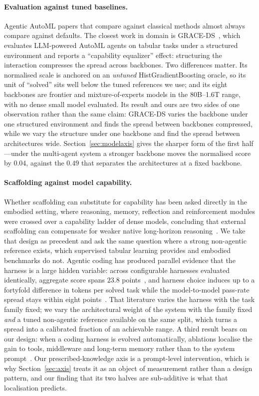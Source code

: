 \paragraph{Evaluation against tuned baselines.} Agentic AutoML papers that
compare against classical methods almost always compare against defaults. The
closest work in domain is GRACE-DS~\citep{tsymbalov2026graceds}, which evaluates
LLM-powered AutoML agents on tabular tasks under a structured environment and
reports a ``capability equalizer'' effect: structuring the interaction compresses
the spread across backbones. Two differences matter. Its normalised scale is
anchored on an \emph{untuned} HistGradientBoosting oracle, so its unit of
``solved'' sits well below the tuned references we use; and its eight backbones
are frontier and mixture-of-experts models in the 80B--1.6T range, with no dense
small model evaluated. Its result and ours are two sides of one observation
rather than the same claim: GRACE-DS varies the backbone under one structured
environment and finds the spread between backbones compressed, while we vary the
structure under one backbone and find the spread between architectures wide.
Section~\ref{sec:modelaxis} gives the sharper form of the first half---under the
multi-agent system a stronger backbone moves the normalised score by $0.04$,
against the $0.49$ that separates the architectures at a fixed backbone.

\paragraph{Scaffolding against model capability.} Whether scaffolding can
substitute for capability has been asked directly in the embodied setting, where
reasoning, memory, reflection and reinforcement modules were crossed over a
capability ladder of dense models, concluding that external scaffolding can
compensate for weaker native long-horizon
reasoning~\citep{agentspec2026}. We take that design as precedent and ask the
same question where a strong non-agentic reference exists, which supervised
tabular learning provides and embodied benchmarks do not. Agentic coding has
produced parallel evidence that the harness is a large hidden variable: across
configurable harnesses evaluated identically, aggregate score spans $23.8$
points~\citep{harnessbench2026}, and harness choice induces up to a fortyfold
difference in tokens per solved task while the model-to-model pass-rate spread
stays within eight points~\citep{scaffoldeffect2026}. That literature varies the
harness with the task family fixed; we vary the architectural weight of the
system with the family fixed \emph{and} a tuned non-agentic reference available
on the same split, which turns a spread into a calibrated fraction of an
achievable range. A third result bears on our design: when a coding harness is
evolved automatically, ablations localise the gain to tools, middleware and
long-term memory rather than to the system prompt~\citep{harness2026prompt}. Our
prescribed-knowledge axis is a prompt-level intervention, which is why
Section~\ref{sec:axis} treats it as an object of measurement rather than a design
pattern, and our finding that its two halves are sub-additive is what that
localisation predicts.
